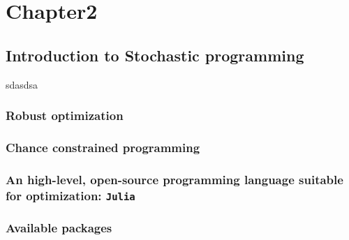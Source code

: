 
\chapter{Chapter2} %

\label{Test assembly} %


\newcommand{\keyword}[1]{\textbf{#1}}
\newcommand{\tabhead}[1]{\textbf{#1}}
\newcommand{\code}[1]{\texttt{#1}}
\newcommand{\file}[1]{\texttt{\bfseries#1}}
\newcommand{\option}[1]{\texttt{\itshape#1}}



\section{Introduction to Stochastic programming}
sdasdsa
\subsection{Robust optimization}
\subsection{Chance constrained programming}
\subsection{An high-level, open-source programming language suitable for optimization: \texttt{Julia}}
\subsection{Available packages}


